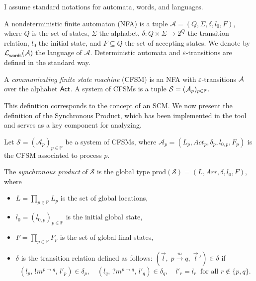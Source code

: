 I assume standard notations for automata, words, and languages. 
\begin{definition}[NFA]
    A nondeterministic finite automaton (NFA) is a tuple 
    $\mathcal A = (Q, \Sigma, \delta, l_0, F)$, where $Q$ is the set of states, 
    $\Sigma$ the alphabet, $\delta : Q \times \Sigma \to 2^Q$ the transition relation, 
    $l_0$ the initial state, and $F \subseteq Q$ the set of accepting states. 
    We denote by $\mathcal{L}_{\mathsf{words}}^{}(\mathcal A)$ the language of $\mathcal A$. 
    Deterministic automata and $\varepsilon$-transitions are defined in the standard way.  
\end{definition}

\begin{definition}[CFSM] \label{def:cfsm}
    A \emph{communicating finite state machine} (CFSM) is an NFA with 
    $\varepsilon$-transitions $\mathcal{A}$ over the alphabet $\mathsf{Act}$.  
    A system of CFSMs is a tuple $\mathcal{S} = (\mathcal{A}_p)_{p \in \mathbb{P}}$.
\end{definition}

This definition corresponds to the concept of an SCM. We now present the
definition of the Synchronous Product, which has been implemented in the
tool and serves as a key component for analyzing.

\begin{definition}
Let $\mathcal{S} = (\mathcal{A}_p)_{p \in \mathbb{P}}$ be a system of CFSMs, where 
$\mathcal{A}_p = (L_p, \mathit{Act}_p, \delta_p, l_{0,p}, F_p)$ is the CFSM associated 
to process $p$.  

The \emph{synchronous product} of $\mathcal{S}$ is the global type 
$\mathrm{prod}(\mathcal{S}) = (L, \mathit{Arr}, \delta, l_0, F)$,
where
\begin{itemize}
    \item $L = \prod_{p \in \mathbb{P}} L_p$ is the set of global locations,
    \item $l_0 = (l_{0,p})_{p \in \mathbb{P}}$ is the initial global state,
    \item $F = \prod_{p \in \mathbb{P}} F_p$ is the set of global final states,
    \item $\delta$ is the transition relation defined as follows:  
    $(\vec{l}, \; p \xrightarrow{m} q, \; \vec{l}\,') \in \delta$ if
    \[
    (l_p,\, !m^{p \to q},\, l'_p) \in \delta_p, \quad 
    (l_q,\, ?m^{p \to q},\, l'_q) \in \delta_q, \quad 
    l'_r = l_r \;\; \text{for all } r \notin \{p,q\}.
    \]
\end{itemize}
\end{definition}

